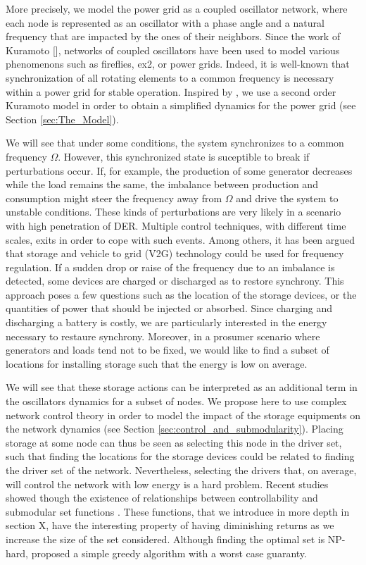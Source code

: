 \documentclass[conference]{IEEEtran}
\begin{document}
More precisely, we model the power grid as a coupled oscillator network, where each node is represented as an oscillator with a phase angle and a natural frequency that are impacted by the ones of their neighbors. Since the work of Kuramoto [], networks of coupled oscillators have been used to model various phenomenons such as fireflies, ex2, or power grids. Indeed, it is well-known that synchronization of all rotating elements to a common frequency is necessary within a power grid for stable operation. Inspired by \cite{Filatrella2008}, we use a second order Kuramoto model in order to obtain a simplified dynamics for the power grid (see Section \ref{sec:The_Model}). 
 
We will see that under some conditions, the system synchronizes to a common frequency $\Omega$. However, this synchronized state is suceptible to break if perturbations occur. If, for example, the production of some generator decreases while the load remains the same, the imbalance between production and consumption might steer the frequency away from $\Omega$ and drive the system to unstable conditions. These kinds of perturbations are very likely in a scenario with high penetration of DER. Multiple control techniques, with different time scales, exits in order to cope with such events. Among others, it has been argued that storage and vehicle to grid (V2G) technology could be used for frequency regulation. If a sudden drop or raise of the frequency due to an imbalance is detected, some devices are charged or discharged as to restore synchrony. This approach poses a few questions such as the location of the storage devices, or the quantities of power that should be injected or absorbed. Since charging and discharging a battery is costly, we are particularly interested in the energy necessary to restaure synchrony. Moreover, in a prosumer scenario where generators and loads tend not to be fixed, we would like to find a subset of locations for installing storage such that the energy is low on average. 

We will see that these storage actions can be interpreted as an additional term in the oscillators dynamics for a subset of nodes. We propose here to use complex network control theory \cite{Liu2015} in order to model the impact of the storage equipments on the network dynamics (see Section \ref{sec:control_and_submodularity}). Placing storage at some node can thus be seen as selecting this node in the driver set, such that finding the locations for the storage devices could be related to finding the driver set of the network. Nevertheless, selecting the drivers that, on average, will control the network with low energy is a hard problem. Recent studies showed though the existence of relationships between controllability and submodular set functions \cite{Summers2014}. These functions, that we introduce in more depth in section X, have the interesting property of having diminishing returns as we increase the size of the set considered. Although finding the optimal set is NP-hard, \cite{Minoux} proposed a simple greedy algorithm with a worst case guaranty. 
\end{document}
